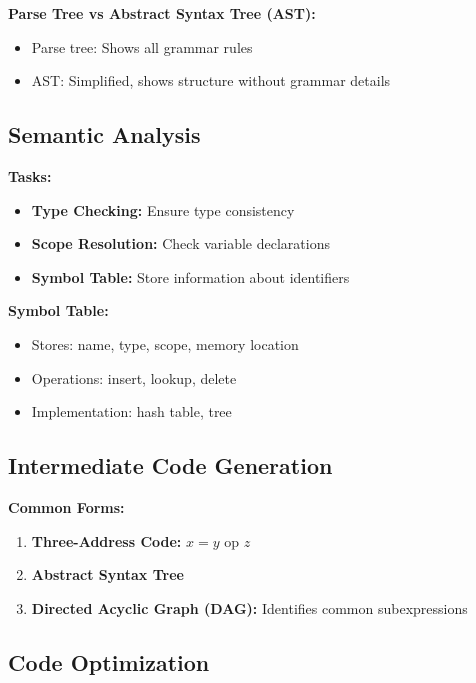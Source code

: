 \documentclass[11pt,a4paper]{article}
\begin{document}
\textbf{Parse Tree vs Abstract Syntax Tree (AST):}
\begin{itemize}
    \item Parse tree: Shows all grammar rules
    \item AST: Simplified, shows structure without grammar details
\end{itemize}

\subsection{Semantic Analysis}

\textbf{Tasks:}
\begin{itemize}
    \item \textbf{Type Checking:} Ensure type consistency
    \item \textbf{Scope Resolution:} Check variable declarations
    \item \textbf{Symbol Table:} Store information about identifiers
\end{itemize}

\textbf{Symbol Table:}
\begin{itemize}
    \item Stores: name, type, scope, memory location
    \item Operations: insert, lookup, delete
    \item Implementation: hash table, tree
\end{itemize}

\subsection{Intermediate Code Generation}

\textbf{Common Forms:}
\begin{enumerate}
    \item \textbf{Three-Address Code:} $x = y \text{ op } z$
    \item \textbf{Abstract Syntax Tree}
    \item \textbf{Directed Acyclic Graph (DAG):} Identifies common subexpressions
\end{enumerate}

\subsection{Code Optimization}
\end{document}
